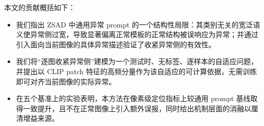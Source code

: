 本文的贡献概括如下：
\begin{itemize}[leftmargin=1.2em,itemsep=1pt,topsep=2pt]
\item 我们指出 ZSAD 中通用异常 prompt 的一个结构性局限：其类别无关的宽泛语义使异常侧过宽，导致显著偏离正常模板的正常结构被误响应为异常；并通过引入面向当前图像的具体异常描述验证了收紧异常侧的有效性。
\item 我们将“逐图收紧异常侧”建模为一个测试时、无标签、逐样本的自适应问题，并提出以 CLIP patch 特征的高频分量作为该自适应的可计算依据，无需训练即可对齐当前图像的实际异常。
\item 在五个基准上的实验表明，本方法在像素级定位指标上较通用 prompt 基线取得一致提升，且不在正常图像上引入额外误报，同时给出机制层面的消融以厘清增益来源。
\end{itemize}
